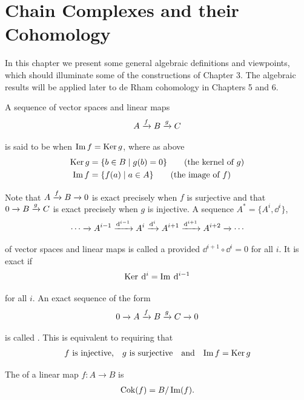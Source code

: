 \chapter{Chain Complexes and their Cohomology}
In this chapter we present some general algebraic definitions and viewpoints,
which should illuminate some of the constructions of Chapter 3. The algebraic
results will be applied later to de Rham cohomology in Chapters 5 and 6.

A sequence of vector spaces and linear maps
\begin{align}\label{eq:4-1}
  A \xra[f] B \xra[g] C
\end{align}

is said to be  when $\operatorname{Im} f = \operatorname{Ker} g$, where as above
\begin{align*}
  \operatorname{Ker} g & = \{b\in B \mid g(b) = 0\}\qquad \text{(the kernel of $g$)} \\
  \operatorname{Im} f  & = \{f(a) \mid a\in A\}\qquad \text{(the image of $f$)}
\end{align*}

Note that $A\xra[f]B\xra[]0$ is exact precisely when $f$ is surjective and that $0\xra[]B\xra[g]C$ is exact
precisely when $g$ is injective. A sequence $A^* = \{A^i, \dd^i\}$,
\begin{align}\label{eq:4-2}
  \cdots \xra[] A^{i-1}\xra[\dd^{i-1}] A^i \xra[\dd^i] A^{i+1} \xra[\dd^{i+1}] A^{i+2}\xra[]\cdots
\end{align}

of vector spaces and linear maps is called a  provided $\dd^{i+1}\circ\dd^i = 0$
for all $i$. It is exact if
\begin{align*}
  \ker \dd^i = \im \dd^{i-1}
\end{align*}

for all $i$. An exact sequence of the form
\begin{align}\label{eq:4-3}
  0\xra[]A\xra[f]B\xra[g]C\xra[]0
\end{align}

is called . This is equivalent to requiring that
\begin{align*}
  \text{$f$ is injective,\quad $g$ is surjective\quad and\quad $\operatorname{Im} f = \operatorname{Ker} g$}
\end{align*}

The  of a linear map $f:A\to B$ is
\begin{align*}
  \operatorname{Cok}(f) = B/\operatorname{Im}(f).
\end{align*}

